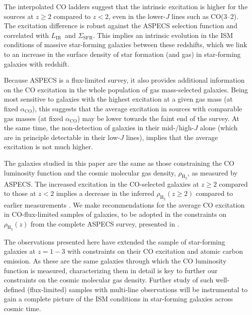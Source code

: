 \documentclass[twocolumn]{aastex62}
\newcommand{\LIR}{\ensuremath{L_{\mathrm{IR}}}}
\newcommand{\SigmaSFR}{\ensuremath{\Sigma_{\mathrm{SFR}}}}
\newcommand{\HH}{\ensuremath{\mathrm{H}_{2}}}
\newcommand{\aco}{\ensuremath{\alpha_{\mathrm{CO}}}}
\newcommand{\rhoHH}{\ensuremath{\rho_{\HH}}}
\begin{document}
The interpolated CO ladders suggest that the intrinsic excitation is higher for
the sources at $z\ge2$ compared to $z<2$, even in the lower-$J$ lines such as
CO(3--2).  The excitation difference is robust against the ASPECS selection
function and correlated with \LIR\ and \SigmaSFR.  This implies an intrinsic
evolution in the ISM conditions of massive star-forming galaxies between these
redshifts, which we link to an increase in the surface density of star
formation (and gas) in star-forming galaxies with redshift.

Because ASPECS is a flux-limited survey, it also provides additional
information on the CO excitation in the whole population of gas mass-selected
galaxies.  Being most sensitive to galaxies with the highest excitation at a
given gas mass (at fixed \aco), this suggests that the average excitation in
sources with comparable gas masses (at fixed \aco) may be lower towards the
faint end of the survey.  At the same time, the non-detection of galaxies in
their mid-/high-$J$ alone (which are in principle detectable in their low-$J$
lines), implies that the average excitation is not much higher.

The galaxies studied in this paper are the same as those constraining the CO
luminosity function and the cosmic molecular gas density, $\rhoHH$, as measured
by ASPECS.  The increased excitation in the CO-selected galaxies at $z \ge 2$
compared to those at $z<2$ implies a decrease in the inferred $\rhoHH(z\ge2)$
compared to earlier measurements \citep{Decarli2016a, Decarli2019}.  We make
recommendations for the average CO excitation in CO-flux-limited samples of
galaxies, to be adopted in the constraints on $\rhoHH(z)$ from the complete
ASPECS survey, presented in \cite{Decarli2020}.

The observations presented here have extended the sample of star-forming
galaxies at $z=1-3$ with constraints on their CO excitation and atomic carbon
emission.  As these are the same galaxies through which the CO luminosity
function is measured, characterizing them in detail is key to further our
constraints on the cosmic molecular gas density.  Further study of such
well-defined (flux-limited) samples with multi-line observations will be
instrumental to gain a complete picture of the ISM conditions in star-forming
galaxies across cosmic time.

\acknowledgments
\end{document}
